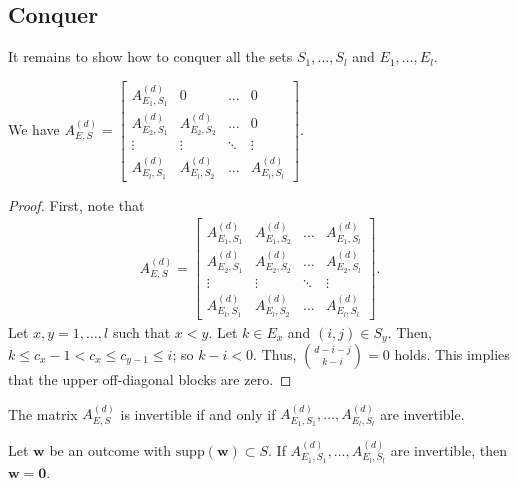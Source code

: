 \subsection*{Conquer}

It remains to show how to conquer all the sets \( S_1, \dots, S_l \) and \( E_1, \dots, E_l \).

\begin{proposition}
    We have \( A_{E,S}^{(d)} = 
    \begin{bmatrix}
        A_{E_1,S_1}^{(d)} & 0 & \dots & 0 \\
        A_{E_2,S_1}^{(d)} & A_{E_2,S_2}^{(d)} & \dots & 0 \\
        \vdots & \vdots & \ddots & \vdots \\
        A_{E_l,S_1}^{(d)} & A_{E_l,S_2}^{(d)} & \dots & A_{E_l,S_l}^{(d)}
    \end{bmatrix} \).
\end{proposition}

\begin{proof}
    First, note that 
    \begin{align*}
        A_{E,S}^{(d)} = 
        \begin{bmatrix}
            A_{E_1,S_1}^{(d)} & A_{E_1,S_2}^{(d)} & \dots & A_{E_1,S_l}^{(d)} \\
            A_{E_2,S_1}^{(d)} & A_{E_2,S_2}^{(d)} & \dots & A_{E_2,S_l}^{(d)} \\
            \vdots & \vdots & \ddots & \vdots \\
            A_{E_l,S_1}^{(d)} & A_{E_l,S_2}^{(d)} & \dots & A_{E_l,S_l}^{(d)}
        \end{bmatrix}.
    \end{align*}
    Let \( x,y = 1, \dots , l \) such that \( x < y \). Let \( k \in E_x \) and \( (i,j) \in S_y \).
    Then, \( k \leq c_x - 1 < c_x \leq c_{y - 1} \leq i \); so \( k - i < 0 \). Thus, \( \binom{d-i-j}{k-i} = 0 \) holds. This implies that the upper off-diagonal blocks are zero.
\end{proof}

\begin{corollary}
    The matrix \( A^{(d)}_{E,S} \) is invertible if and only if \( A^{(d)}_{E_1,S_1}, \dots,  A^{(d)}_{E_l,S_l} \) are invertible.
\end{corollary}

\begin{corollary}
    Let \( \mathbf{w} \) be an outcome with \( \mathrm{supp}(\mathbf w) \subset S \).
    If \( A^{(d)}_{E_1,S_1}, \dots,  A^{(d)}_{E_l,S_l} \) are invertible, then \( \mathbf{w} = \mathbf 0 \).
\end{corollary}

